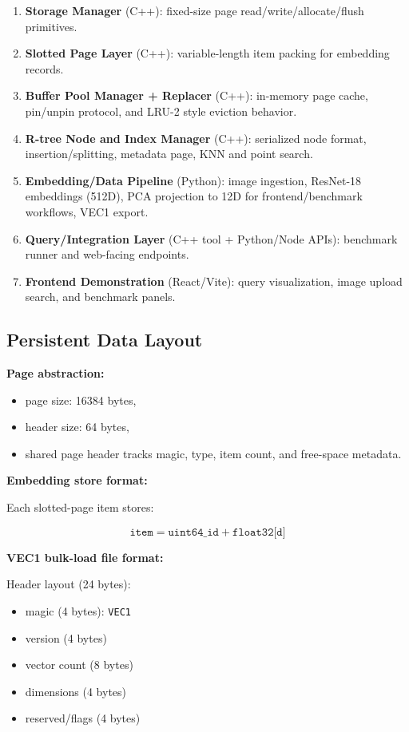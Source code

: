 \documentclass[11pt,a4paper]{article}
\begin{document}
\begin{enumerate}[leftmargin=1.7em]
  \item \textbf{Storage Manager} (C++): fixed-size page read/write/allocate/flush primitives.
  \item \textbf{Slotted Page Layer} (C++): variable-length item packing for embedding records.
  \item \textbf{Buffer Pool Manager + Replacer} (C++): in-memory page cache, pin/unpin protocol, and LRU-2 style eviction behavior.
  \item \textbf{R-tree Node and Index Manager} (C++): serialized node format, insertion/splitting, metadata page, KNN and point search.
  \item \textbf{Embedding/Data Pipeline} (Python): image ingestion, ResNet-18 embeddings (512D), PCA projection to 12D for frontend/benchmark workflows, VEC1 export.
  \item \textbf{Query/Integration Layer} (C++ tool + Python/Node APIs): benchmark runner and web-facing endpoints.
  \item \textbf{Frontend Demonstration} (React/Vite): query visualization, image upload search, and benchmark panels.
\end{enumerate}

\subsection{Persistent Data Layout}

\textbf{Page abstraction:}

\begin{itemize}[leftmargin=1.5em]
  \item page size: 16384 bytes,
  \item header size: 64 bytes,
  \item shared page header tracks magic, type, item count, and free-space metadata.
\end{itemize}

\textbf{Embedding store format:}

Each slotted-page item stores:

\[
\texttt{item} = \texttt{uint64\_id} + \texttt{float32[d]}
\]

\textbf{VEC1 bulk-load file format:}

Header layout (24 bytes):

\begin{itemize}[leftmargin=1.5em]
  \item magic (4 bytes): \texttt{VEC1}
  \item version (4 bytes)
  \item vector count (8 bytes)
  \item dimensions (4 bytes)
  \item reserved/flags (4 bytes)
\end{itemize}
\end{document}
